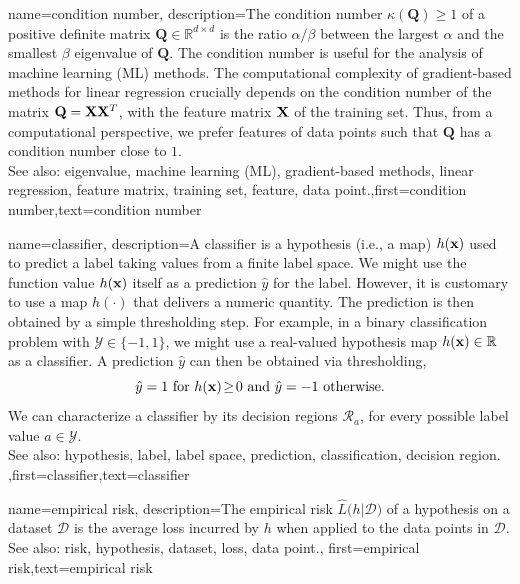 {
	name={condition number},
	description={The condition number $\kappa(\mathbf{Q}) \geq 1$ of a 
		positive definite 
		matrix $\mathbf{Q} \in \mathbb{R}^{d \times d}$ is the ratio 
		$\alpha /\beta  $ between the 
		largest $\alpha$ and the smallest $\beta$ eigenvalue of 
		$\mathbf{Q}$. The condition number is useful for the analysis of machine learning (ML) methods. 
		The computational complexity of gradient-based methods for linear regression crucially depends on the 
		condition number of the matrix $\mathbf{Q} = {\bf X} {\bf X}^{T}$, with the feature matrix ${\bf X}$ 
		of the training set. Thus, from a computational perspective, we prefer features of 
		data points such that $\mathbf{Q}$ has a condition number close to $1$.
					\\ 
		See also: eigenvalue, machine learning (ML), gradient-based methods, linear regression, feature matrix, training set, feature, data point.},first={condition number},text={condition number} 
}

{
	name={classifier},
	description={A classifier is a hypothesis (i.e., a map) $h({\bf x})$ 
		used to predict a label taking values from a finite label space. We might use the 
		function value $h({\bf x})$ itself as a prediction $\hat{y}$ for 
		the label. However, it is customary to use a map $h(\cdot)$ that delivers 
		a numeric quantity. The prediction is then obtained by a simple thresholding step. 
		For example, in a binary classification problem with \label{labelspace} $\mathcal{Y} \in  \{ -1,1\}$, 
		we might use a real-valued hypothesis map $h({\bf x}) \in \mathbb{R}$ 
		as a classifier. A prediction $\hat{y}$ can then be obtained via thresholding,  
		 \begin{equation} 
		 	\label{equ_def_threshold_bin_classifier_dict}
		 	\hat{y} =1   \mbox{ for } h({\bf x})\!\geq\!0 \mbox{ and } 	\hat{y} =-1  \mbox{ otherwise.}
	 		\end{equation}
 		We can characterize a classifier by its decision regions $\mathcal{R}_{a}$, for 
 		every possible label value $a \in \mathcal{Y}$.
					\\ 
		See also: hypothesis, label, label space, prediction, classification, decision region. },first={classifier},text={classifier} 
}

{name={empirical risk},
  description={The empirical risk $\widehat{L}\big(h|\mathcal{D}\big)$ 
  	of a hypothesis on a dataset $\mathcal{D}$ is the average loss incurred 
  	by $h$ when applied to the data points in $\mathcal{D}$.
				\\ 
		See also: risk, hypothesis, dataset, loss, data point.},
  first={empirical risk},text={empirical risk} 
}

